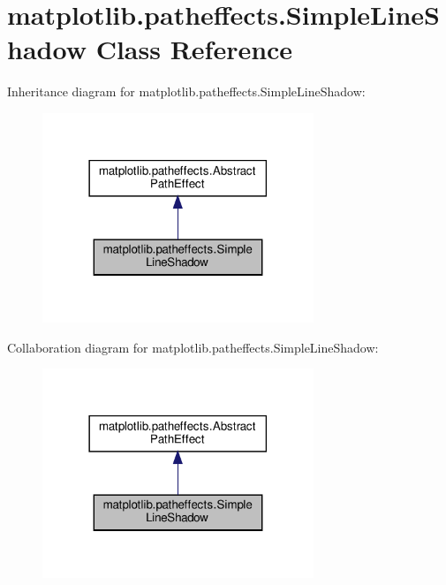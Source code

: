 \hypertarget{classmatplotlib_1_1patheffects_1_1SimpleLineShadow}{}\section{matplotlib.\+patheffects.\+Simple\+Line\+Shadow Class Reference}
\label{classmatplotlib_1_1patheffects_1_1SimpleLineShadow}


Inheritance diagram for matplotlib.\+patheffects.\+Simple\+Line\+Shadow\+:
\nopagebreak
\begin{figure}[H]
\begin{center}
\leavevmode
\includegraphics[width=230pt]{classmatplotlib_1_1patheffects_1_1SimpleLineShadow__inherit__graph}
\end{center}
\end{figure}


Collaboration diagram for matplotlib.\+patheffects.\+Simple\+Line\+Shadow\+:
\nopagebreak
\begin{figure}[H]
\begin{center}
\leavevmode
\includegraphics[width=230pt]{classmatplotlib_1_1patheffects_1_1SimpleLineShadow__coll__graph}
\end{center}
\end{figure}
